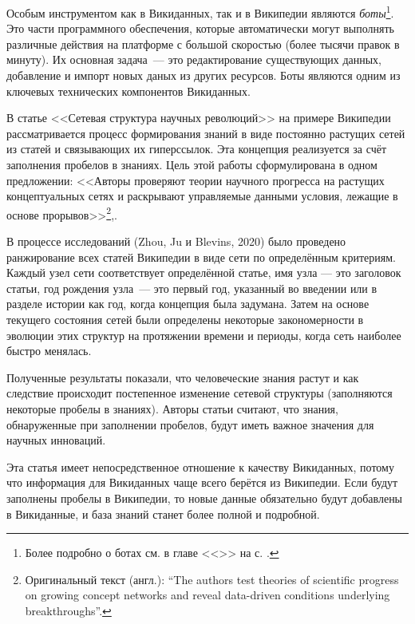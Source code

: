 Особым инструментом как в Викиданных, так и в Википедии являются \emph{боты}\footnote{%
%
Более подробно о ботах см. в главе <<>> на с. \pageref{ch:bots}.%
%
}. Это части программного обеспечения, которые автоматически могут выполнять различные действия на платформе с большой скоростью (более тысячи правок в минуту). Их основная задача~--- это редактирование существующих данных, добавление и импорт новых даных из других ресурсов. Боты являются одним из ключевых технических компонентов Викиданных. 

В статье <<Сетевая структура научных революций>>\autocite{Network_structure_revolutions} на примере Википедии рассматривается процесс формирования знаний в виде постоянно растущих сетей из статей и связывающих их гиперссылок. Эта концепция реализуется за счёт заполнения пробелов в знаниях. Цель этой работы сформулирована в одном предложении: <<Авторы проверяют теории научного прогресса на растущих концептуальных сетях и раскрывают управляемые данными условия, лежащие в основе прорывов>>\footnote{Оригинальный текст (англ.):  ``The authors test theories of scientific progress on growing concept networks and reveal data-driven conditions underlying breakthroughs''.},\autocite{Network_structure_revolutions}.

В процессе исследований (Zhou, Ju и Blevins, 2020)\autocite{Network_structure_revolutions}  было проведено ранжирование всех статей Википедии в виде сети по определённым критериям. Каждый узел сети соответствует определённой статье, имя узла --- это заголовок статьи, год рождения узла~--- это первый год, указанный во введении или в разделе истории как год, когда концепция была задумана. Затем на основе текущего состояния сетей были определены некоторые закономерности в эволюции этих структур на протяжении времени и периоды, когда сеть наиболее быстро менялась.

Полученные результаты показали, что человеческие знания растут и как следствие происходит постепенное изменение сетевой структуры (заполняются некоторые пробелы в знаниях). Авторы статьи\autocite{Network_structure_revolutions} считают, что знания, обнаруженные при заполнении пробелов, будут иметь важное значения для научных инноваций. 

Эта статья\autocite{Network_structure_revolutions} имеет непосредственное отношение к качеству Викиданных, потому что информация для Викиданных чаще всего берётся из Википедии. Если будут заполнены пробелы в Википедии, то новые данные обязательно будут добавлены в Викиданные, и база знаний станет более полной и подробной.
